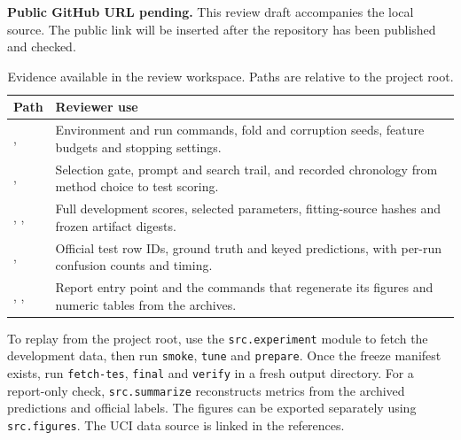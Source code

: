 \noindent\colorbox{pale}{\parbox{\dimexpr\linewidth-2\fboxsep\relax}{%
\textbf{Public GitHub URL pending.} This review draft accompanies the local source. The public link will be inserted after the repository has been published and checked.}}\par

\begin{table}[H]\small
\caption{Evidence available in the review workspace. Paths are relative to the project root.}
\begin{tabularx}{\linewidth}{@{}P{54mm}Y@{}}
\toprule
Path & Reviewer use \\
\midrule
{},  &
Environment and run commands, fold and corruption seeds, feature budgets and stopping settings.\\
,  &
Selection gate, prompt and search trail, and recorded chronology from method choice to test scoring.\\
, ,  &
Full development scores, selected parameters, fitting-source hashes and frozen artifact digests.\\
,  &
Official test row IDs, ground truth and keyed predictions, with per-run confusion counts and timing.\\
, ,  &
Report entry point and the commands that regenerate its figures and numeric tables from the archives.\\
\bottomrule
\end{tabularx}
\end{table}

To replay from the project root, use the \texttt{src.experiment} module to fetch the development data, then run \texttt{smoke}, \texttt{tune} and \texttt{prepare}. Once the freeze manifest exists, run \texttt{fetch-tes}, \texttt{final} and \texttt{verify} in a fresh output directory. For a report-only check, \texttt{src.summarize} reconstructs metrics from the archived predictions and official labels. The figures can be exported separately using \texttt{src.figures}. The UCI data source is linked in the references.
